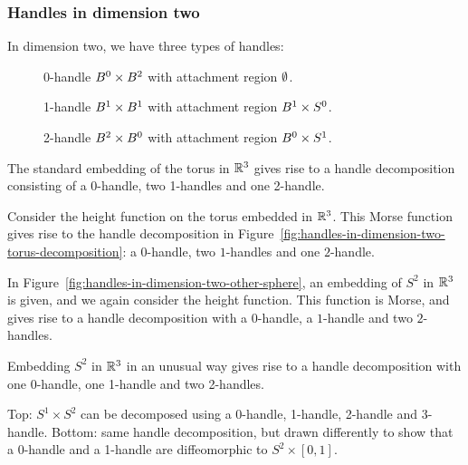 \subsubsection*{Handles in dimension two}
In dimension two, we have three types of handles:
\begin{description}
    \item[] 0-handle  $B^{0} \times B^{2}$ with attachment region $\emptyset$.
    \item[] 1-handle  $B^{1} \times B^{1}$ with attachment region $B^{1} \times S^{0}$.
    \item[] 2-handle  $B^{2} \times B^{0}$ with attachment region $B^{0} \times S^1$.
    \end{description}
\begin{marginfigure}
    \centering
    \caption{The standard embedding of the torus in $\mathbb{R}^3$ gives rise to a handle decomposition consisting of a 0-handle, two 1-handles and one 2-handle.}
    \label{fig:handles-in-dimension-two-torus-decomposition}
\end{marginfigure}
\begin{eg}
    Consider the height function on the torus embedded in $\mathbb{R}^3$. This Morse function gives rise to the handle decomposition in Figure~\ref{fig:handles-in-dimension-two-torus-decomposition}: a $0$-handle, two $1$-handles and one $2$-handle.
\end{eg}

\begin{eg}
    In Figure~\ref{fig:handles-in-dimension-two-other-sphere}, an embedding of $S^2$ in $\mathbb{R}^3$ is given, and we again consider the height function.
    This function is Morse, and gives rise to a handle decomposition with a $0$-handle, a $1$-handle and two $2$-handles.
\end{eg}
\begin{marginfigure}
    \centering
    \caption{Embedding $S^2$ in $ \mathbb{R}^3$ in an unusual way gives rise to a handle decomposition with one 0-handle, one 1-handle and two 2-handles. }
    \label{fig:handles-in-dimension-two-other-sphere}
\end{marginfigure}
\begin{marginfigure}
    \centering
    \caption{Top: $ S^1 \times S^{2}$ can be decomposed using a 0-handle, 1-handle, 2-handle and 3-handle.
        Bottom: same handle decomposition, but drawn differently to show that  a 0-handle and a 1-handle are diffeomorphic to $S^{2} \times [0,1]$.
}
    \label{fig:handles-in-dimension-three-s1-x-s2}
\end{marginfigure}

